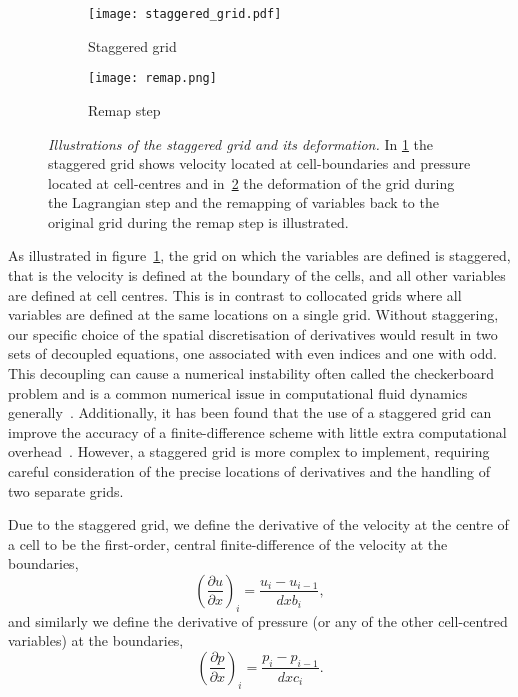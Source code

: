 \begin{figure}[t]
    \hfill
    \begin{subfigure}{0.3\textwidth}
      \centering
      \texttt{[image: staggered\_grid.pdf]}
      \caption{Staggered grid}%
      \label{fig:staggered_grid}
    \end{subfigure}
    \hfill
    \begin{subfigure}{0.49\textwidth}
      \texttt{[image: remap.png]}
      \caption{Remap step}%
      \label{fig:remap}
    \end{subfigure}
    \caption{\emph{Illustrations of the staggered grid and its deformation.} In \ref{fig:staggered_grid} the staggered grid shows velocity located at cell-boundaries and pressure located at cell-centres and in~\ref{fig:remap} the deformation of the grid during the Lagrangian step and the remapping of variables back to the original grid during the remap step is illustrated.}
\label{fig:grid_and_remap}%
\end{figure}

As illustrated in figure~\ref{fig:staggered_grid}, the grid on which the variables are defined is staggered, that is the velocity is defined at the boundary of the cells, and all other variables are defined at cell centres. This is in contrast to collocated grids where all variables are defined at the same locations on a single grid. Without staggering, our specific choice of the spatial discretisation of derivatives would result in two sets of decoupled equations, one associated with even indices and one with odd. This decoupling can cause a numerical instability often called the checkerboard problem and is a common numerical issue in computational fluid dynamics generally~\cite{ferzigerComputationalMethodsFluid2002}. Additionally, it has been found that the use of a staggered grid can improve the accuracy of a finite-difference scheme with little extra computational overhead~\cite{rojanaratanangkulePerformanceHighOrder2015}. However, a staggered grid is more complex to implement, requiring careful consideration of the precise locations of derivatives and the handling of two separate grids. 

Due to the staggered grid, we define the derivative of the velocity at the centre of a cell to be the first-order, central finite-difference of the velocity at the boundaries,
\begin{equation}
  {\left( \frac{\partial u}{\partial x} \right)}_i = \frac{u_i - u_{i-1}}{dxb_i},
  \label{}
\end{equation}
and similarly we define the derivative of pressure (or any of the other cell-centred variables) at the boundaries,
\begin{equation}
  {\left( \frac{\partial p}{\partial x} \right)}_i = \frac{p_i - p_{i-1}}{dxc_i}.
  \label{}
\end{equation}

